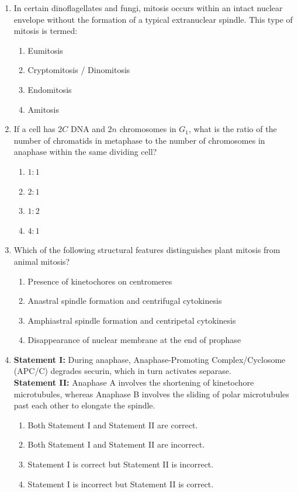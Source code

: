 \documentclass[11pt,a4paper]{article}
\begin{document}
\begin{enumerate}[label=\textbf{\arabic*.}, leftmargin=*]
\item In certain dinoflagellates and fungi, mitosis occurs within an intact nuclear envelope without the formation of a typical extranuclear spindle. This type of mitosis is termed:
\begin{enumerate}[label=(\alph*)]
    \item Eumitosis
    \item Cryptomitosis / Dinomitosis
    \item Endomitosis
    \item Amitosis
\end{enumerate}

\item If a cell has $2C$ DNA and $2n$ chromosomes in $G_1$, what is the ratio of the number of chromatids in metaphase to the number of chromosomes in anaphase within the same dividing cell?
\begin{enumerate}[label=(\alph*)]
    \item $1 : 1$
    \item $2 : 1$
    \item $1 : 2$
    \item $4 : 1$
\end{enumerate}

\item Which of the following structural features distinguishes plant mitosis from animal mitosis?
\begin{enumerate}[label=(\alph*)]
    \item Presence of kinetochores on centromeres
    \item Anastral spindle formation and centrifugal cytokinesis
    \item Amphiastral spindle formation and centripetal cytokinesis
    \item Disappearance of nuclear membrane at the end of prophase
\end{enumerate}

\item \textbf{Statement I:} During anaphase, Anaphase-Promoting Complex/Cyclosome (APC/C) degrades securin, which in turn activates separase.\\
\textbf{Statement II:} Anaphase A involves the shortening of kinetochore microtubules, whereas Anaphase B involves the sliding of polar microtubules past each other to elongate the spindle.
\begin{enumerate}[label=(\alph*)]
    \item Both Statement I and Statement II are correct.
    \item Both Statement I and Statement II are incorrect.
    \item Statement I is correct but Statement II is incorrect.
    \item Statement I is incorrect but Statement II is correct.
\end{enumerate}


\end{enumerate}
\end{document}
